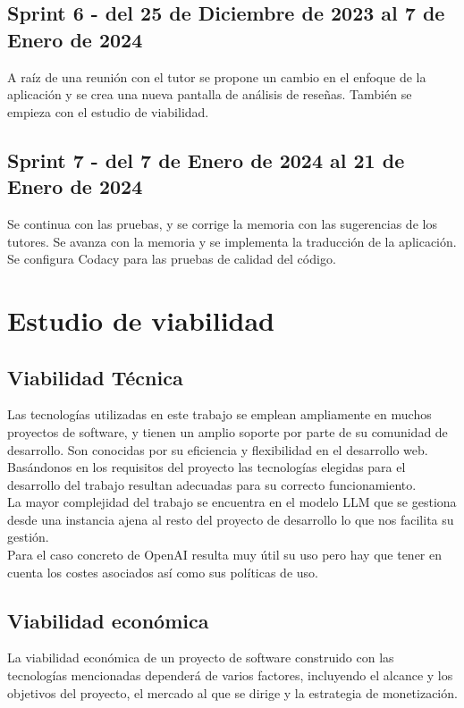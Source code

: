 \subsection{Sprint 6 - del 25 de Diciembre de 2023 al 7 de Enero de 2024}
A raíz de una reunión con el tutor se propone un cambio en el enfoque de la aplicación y 
se crea una nueva pantalla de análisis de reseñas.
También se empieza con el estudio de viabilidad.
\subsection{Sprint 7 - del 7 de Enero de 2024 al 21 de Enero de 2024}
Se continua con las pruebas, y se corrige la memoria con las sugerencias de los tutores.
Se avanza con la memoria y se implementa la traducción de la aplicación.
Se configura Codacy para las pruebas de calidad del código.

\section{Estudio de viabilidad}

\subsection{Viabilidad Técnica}

Las tecnologías utilizadas en este trabajo se emplean ampliamente en muchos proyectos de software, y 
tienen un amplio soporte por parte de su comunidad de desarrollo. Son conocidas por su eficiencia y 
flexibilidad en el desarrollo web.\\
Basándonos en los requisitos del proyecto las tecnologías elegidas para el desarrollo del trabajo 
resultan adecuadas para su correcto funcionamiento.\\
La mayor complejidad del trabajo se encuentra en el modelo LLM que se gestiona desde una instancia ajena al 
resto del proyecto de desarrollo lo que nos facilita su gestión.\\
Para el caso concreto de OpenAI resulta muy útil su uso pero hay que tener en cuenta los costes asociados 
así como sus políticas de uso.

\subsection{Viabilidad económica}
La viabilidad económica de un proyecto de software construido con las tecnologías 
mencionadas dependerá de varios factores, incluyendo el alcance y los objetivos del proyecto, 
el mercado al que se dirige y la estrategia de monetización.

